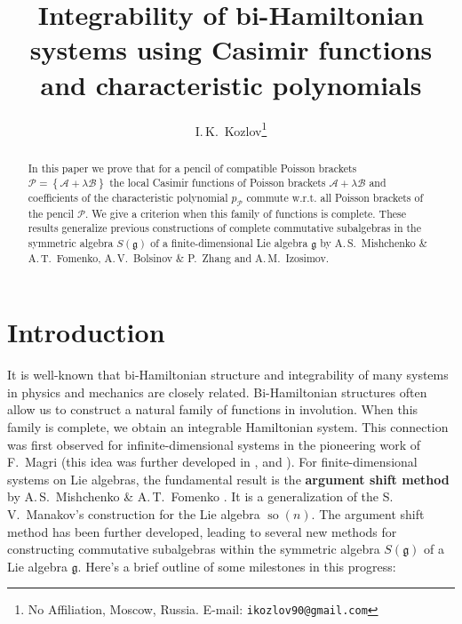 \documentclass[12pt]{article}
\theoremstyle{definition}
\begin{document}
\title{Integrability of bi-Hamiltonian systems using Casimir functions and characteristic polynomials}
\author{I.\,K.~Kozlov\thanks{No Affiliation, Moscow, Russia. E-mail: {\tt ikozlov90@gmail.com} }
}
\date{}




\maketitle


\begin{abstract} In this paper we prove that for a pencil of compatible Poisson brackets $\mathcal{P} = \left\{\mathcal{A} + \lambda\mathcal{B} \right\}$ the local Casimir functions of Poisson brackets $\mathcal{A} + \lambda \mathcal{B}$  and coefficients of the characteristic polynomial $p_{\mathcal{P}}$ commute w.r.t. all Poisson brackets of the pencil $\mathcal{P}$. We give a criterion when this family of functions is complete. These results generalize previous constructions of complete commutative subalgebras in the symmetric algebra $S(\mathfrak{g})$ of a finite-dimensional Lie algebra $\mathfrak{g}$ by  A.\,S.~Mishchenko \& A.\,T.~Fomenko,  A.\,V.~Bolsinov \& P.~Zhang and A.\,M.~Izosimov. \end{abstract}

\tableofcontents


\section{Introduction}

It is well-known that bi-Hamiltonian structure and integrability of many systems in physics and mechanics are closely related. Bi-Hamiltonian structures often allow us to construct a natural family of functions in involution. When this family is complete, we obtain an integrable Hamiltonian system. This connection was first observed for infinite-dimensional systems in the pioneering work of F.~Magri 
\cite{Magri78} (this idea was further developed in \cite{Gelfand79}, \cite{Magri84} and \cite{Reiman80}). For finite-dimensional systems on Lie algebras, the fundamental result is the \textbf{argument shift method} by A.\,S.~Mishchenko \& A.\,T.~Fomenko \cite{ArgShift}. It is a generalization of the S.\,V.~Manakov's construction \cite{Manakov76} for the Lie algebra $\operatorname{so}(n)$. The argument shift method has been further developed, leading to several new methods for constructing commutative subalgebras within the symmetric algebra $S(\mathfrak{g})$ of a Lie algebra $\mathfrak{g}$. Here's a brief outline of some milestones in this progress: 
\end{document}
